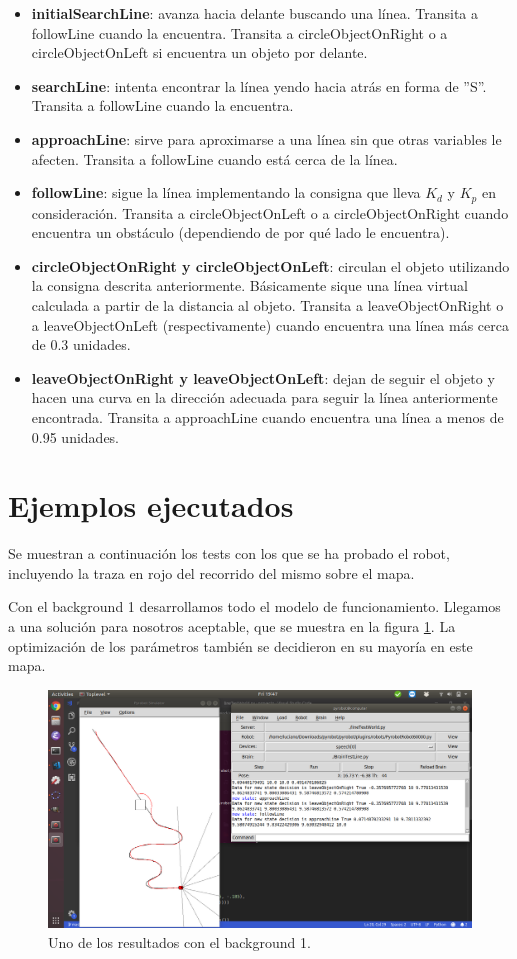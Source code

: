 \documentclass{article}
\begin{document}
\begin{itemize}
    \item \textbf{initialSearchLine}: avanza hacia delante buscando una línea. Transita a followLine cuando la encuentra. Transita a circleObjectOnRight o a circleObjectOnLeft si encuentra un objeto por delante.
    \item \textbf{searchLine}: intenta encontrar la línea yendo hacia atrás en forma de ''S''. Transita a followLine cuando la encuentra.
    \item \textbf{approachLine}: sirve para aproximarse a una línea sin que otras variables le afecten. Transita a followLine cuando está cerca de la línea.
    \item \textbf{followLine}: sigue la línea implementando la consigna que lleva $K_d$ y $K_p$ en consideración. Transita a circleObjectOnLeft o a circleObjectOnRight cuando encuentra un obstáculo (dependiendo de por qué lado le encuentra).
    \item \textbf{circleObjectOnRight y circleObjectOnLeft}: circulan el objeto utilizando la consigna descrita anteriormente. Básicamente sique una línea virtual calculada a partir de la distancia al objeto. Transita a leaveObjectOnRight o a leaveObjectOnLeft (respectivamente) cuando encuentra una línea más cerca de 0.3 unidades.
    \item \textbf{leaveObjectOnRight y leaveObjectOnLeft}: dejan de seguir el objeto y hacen una curva en la dirección adecuada para seguir la línea anteriormente encontrada. Transita a approachLine cuando encuentra una línea a menos de 0.95 unidades.
\end{itemize}

\section{Ejemplos ejecutados}
Se muestran a continuación los tests con los que se ha probado el robot, incluyendo la traza en rojo del recorrido del mismo sobre el mapa.

Con el background 1 desarrollamos todo el modelo de funcionamiento. Llegamos a una solución para nosotros aceptable, que se muestra en la figura \ref{fig:mapa1}. La optimización de los parámetros también se decidieron en su mayoría en este mapa.

\begin{figure}[H]
    \centering
    \includegraphics[width=12cm]{mapa1.png}
    \caption{Uno de los resultados con el background 1.}
    \label{fig:mapa1}
\end{figure}
\end{document}
